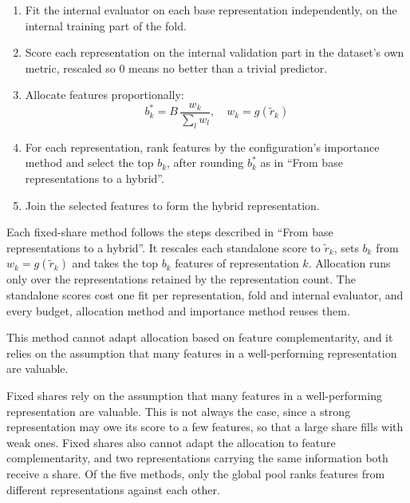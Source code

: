 \begin{enumerate}
    \item Fit the internal evaluator on each base representation independently, on the internal training part of the fold.
    \item Score each representation on the internal validation part in the dataset's own metric, rescaled so 0 means no better than a trivial predictor.
    \item Allocate features proportionally:
    \[
    b^*_k = B \, \frac{w_k}{\sum_{l} w_l}, \quad w_k = g(\tilde r_k) %
    \]
    \item For each representation, rank features by the configuration's importance method and select the top $b_k$, after rounding $b^*_k$ as in ``From base representations to a hybrid''.
    \item Join the selected features to form the hybrid representation.
\end{enumerate}

Each fixed-share method follows the steps described in ``From base representations to a hybrid''. It rescales each standalone score to $\tilde r_k$, sets $b_k$ from $w_k = g(\tilde r_k)$ and takes the top $b_k$ features of representation $k$. Allocation runs only over the representations retained by the representation count. The standalone scores cost one fit per representation, fold and internal evaluator, and every budget, allocation method and importance method reuses them.

This method cannot adapt allocation based on feature complementarity, and it relies on the assumption that many features in a well-performing representation are valuable.

Fixed shares rely on the assumption that many features in a well-performing representation are valuable. This is not always the case, since a strong representation may owe its score to a few features, so that a large share fills with weak ones. Fixed shares also cannot adapt the allocation to feature complementarity, and two representations carrying the same information both receive a share. Of the five methods, only the global pool ranks features from different representations against each other.



